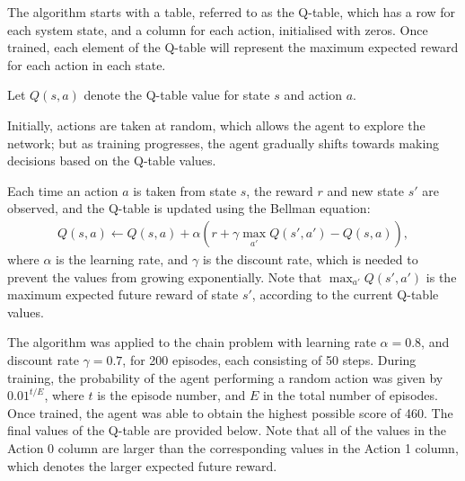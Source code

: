 The algorithm starts with a table, referred to as the Q-table, which has a row
for each system state, and a column for each action, initialised with zeros.
Once trained, each element of the Q-table will represent the maximum expected
reward for each action in each state.

Let $Q(s,a)$ denote the Q-table value for state $s$ and action $a$.

Initially, actions are taken at random, which allows the agent to explore the
network; but as training progresses, the agent gradually shifts towards making
decisions based on the Q-table values.

Each time an action $a$ is taken from state $s$, the reward $r$ and new state
$s'$ are observed, and the Q-table is updated using the Bellman equation:
\begin{align}
    Q(s,a) \leftarrow Q(s,a) + \alpha (r + \gamma\max_{a'}Q(s',a') - Q(s,a)),
    \label{eq:RL:QL}
\end{align}
where $\alpha$ is the learning rate, and $\gamma$ is the discount rate, which is
needed to prevent the values from growing exponentially.
Note that $\max_{a'}Q(s',a')$ is the maximum expected future reward of state
$s'$, according to the current Q-table values.

The algorithm was applied to the chain problem with learning rate $\alpha =
0.8$, and discount rate $\gamma = 0.7$, for 200 episodes, each consisting of 50
steps.
During training, the probability of the agent performing a random action was
given by $0.01^{t/E}$, where $t$ is the episode number, and $E$ in the total
number of episodes.
Once trained, the agent was able to obtain the highest possible score of 460.
The final values of the Q-table are provided below.
Note that all of the values in the Action 0 column are larger than the
corresponding values in the Action 1 column, which denotes the larger expected
future reward.



